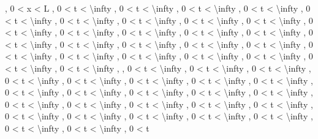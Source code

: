 \documentclass[
]{article}
\begin{document}
, 0 \textless{} x \textless{} L , 0 \textless{} t \textless{}
\textbackslash infty , 0 \textless{} t \textless{} \textbackslash infty
, 0 \textless{} t \textless{} \textbackslash infty , 0 \textless{} t
\textless{} \textbackslash infty , 0 \textless{} t \textless{}
\textbackslash infty , 0 \textless{} t \textless{} \textbackslash infty
, 0 \textless{} t \textless{} \textbackslash infty , 0 \textless{} t
\textless{} \textbackslash infty , 0 \textless{} t \textless{}
\textbackslash infty , 0 \textless{} t \textless{} \textbackslash infty
, 0 \textless{} t \textless{} \textbackslash infty , 0 \textless{} t
\textless{} \textbackslash infty , 0 \textless{} t \textless{}
\textbackslash infty , 0 \textless{} t \textless{} \textbackslash infty
, 0 \textless{} t \textless{} \textbackslash infty , 0 \textless{} t
\textless{} \textbackslash infty , 0 \textless{} t \textless{}
\textbackslash infty , 0 \textless{} t \textless{} \textbackslash infty
, 0 \textless{} t \textless{} \textbackslash infty , 0 \textless{} t
\textless{} \textbackslash infty , 0 \textless{} t \textless{}
\textbackslash infty , 0 \textless{} t \textless{} \textbackslash infty
, 0 \textless{} t \textless{} \textbackslash infty , 0 \textless{} t
\textless{} \textbackslash infty , 0 \textless{} t \textless{}
\textbackslash infty , 0 \textless{} t \textless{} \textbackslash infty
, , 0 \textless{} t \textless{} \textbackslash infty , 0 \textless{} t
\textless{} \textbackslash infty , 0 \textless{} t \textless{}
\textbackslash infty , 0 \textless{} t \textless{} \textbackslash infty
, 0 \textless{} t \textless{} \textbackslash infty , 0 \textless{} t
\textless{} \textbackslash infty , 0 \textless{} t \textless{}
\textbackslash infty , 0 \textless{} t \textless{} \textbackslash infty
, 0 \textless{} t \textless{} \textbackslash infty , 0 \textless{} t
\textless{} \textbackslash infty , 0 \textless{} t \textless{}
\textbackslash infty , 0 \textless{} t \textless{} \textbackslash infty
, 0 \textless{} t \textless{} \textbackslash infty , 0 \textless{} t
\textless{} \textbackslash infty , 0 \textless{} t \textless{}
\textbackslash infty , 0 \textless{} t \textless{} \textbackslash infty
, 0 \textless{} t \textless{} \textbackslash infty , 0 \textless{} t
\textless{} \textbackslash infty , 0 \textless{} t \textless{}
\textbackslash infty , 0 \textless{} t \textless{} \textbackslash infty
, 0 \textless{} t \textless{} \textbackslash infty , 0 \textless{} t
\textless{} \textbackslash infty , 0 \textless{} t \textless{}
\textbackslash infty , 0 \textless{} t \textless{} \textbackslash infty
, 0 \textless{} t \textless{} \textbackslash infty , 0 \textless{} t
\end{document}
